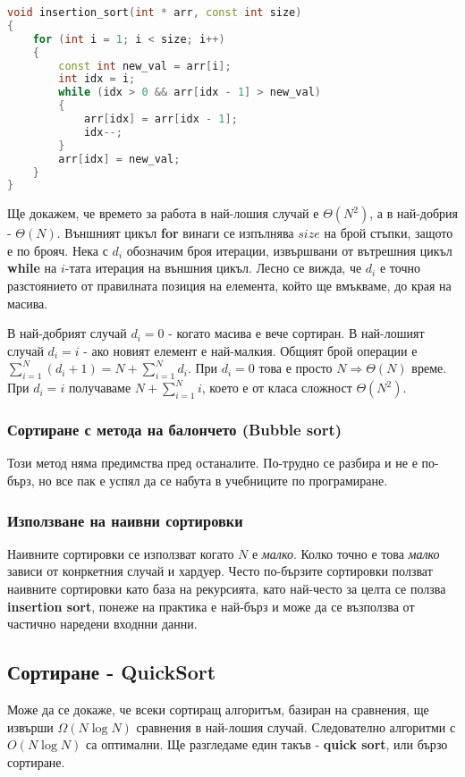 \documentclass[fleqn,12pt]{article}
\begin{document}
\begin{lstlisting}[language=C++, caption=Insertion sort]
void insertion_sort(int * arr, const int size)
{
    for (int i = 1; i < size; i++)
    {
        const int new_val = arr[i];
        int idx = i;
        while (idx > 0 && arr[idx - 1] > new_val)
        {
            arr[idx] = arr[idx - 1];
            idx--; 
        }
        arr[idx] = new_val;
    }
}
\end{lstlisting}

Ще докажем, че времето за работа в най-лошия случай е $\Theta(N^2)$, а в най-добрия - $\Theta(N)$.
Външният цикъл \textbf{for} винаги се изпълнява $size$ на брой стъпки, защото е по брояч.
Нека с $d_i$ обозначим броя итерации, извършвани от вътрешния цикъл \textbf{while} на $i$-тата итерация на външния цикъл.
Лесно се вижда, че $d_i$ е точно разстоянието от правилната позиция на елемента, който ще вмъкваме, до края на масива.

В най-добрият случай $d_i = 0$ - когато масива е вече сортиран. В най-лошият случай $d_i = i$ - ако новият елемент е най-малкия.
Общият брой операции е $\sum_{i = 1}^{N} (d_i + 1) = N + \sum_{i = 1}^{N} d_i$.
При $d_i = 0$ това е просто $N \Rightarrow \Theta(N)$ време. При $d_i = i$ 
получаваме $N + \sum_{i = 1}^N i$, което е от класа сложност $\Theta(N^2)$.

\subsubsection{Сортиране с метода на балончето (Bubble sort)}
Този метод няма предимства пред останалите. По-трудно се разбира и не е по-бърз, но все пак е успял 
да се набута в учебниците по програмиране.

\subsubsection{Използване на наивни сортировки}
Наивните сортировки се използват когато $N$ е \textit{малко}. Колко точно е това \textit{малко} зависи от конркетния случай и хардуер.
Често по-бързите сортировки ползват наивните сортировки като база на рекурсията, като най-често за целта се ползва \textbf{insertion sort}, 
понеже на практика е най-бърз и може да се възползва от частично наредени входнни данни.

\subsection{Сортиране - QuickSort}
Може да се докаже, че всеки сортиращ алгоритъм, базиран на сравнения, ще извърши $\Omega(N \log N)$ сравнения в най-лошия случай.
Следователно алгоритми с $O(N \log N)$ са оптимални. Ще разгледаме един такъв - \textbf{quick sort}, или бързо сортиране.
\end{document}
